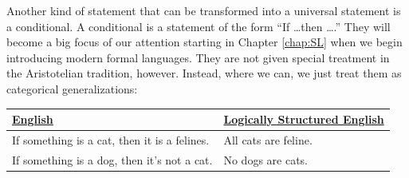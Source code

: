 %
%
%
%
%
%
%

Another kind of statement that can be transformed into a universal statement is a conditional. A conditional is a statement of the form ``If \ldots then \ldots.'' They will become a big focus of our attention starting in Chapter \ref{chap:SL} when we begin introducing modern formal languages. They are not given special treatment in the Aristotelian tradition, however. Instead, where we can, we just treat them as categorical generalizations:

\begin{longtabu}{p{.5\linewidth}p{.5\linewidth}}
\underline{English} &
\underline{Logically Structured English} \\
\endhead
If something is a cat, then it is a felines. &
All cats are feline.\\

If something is a dog, then it's not a cat. &
No dogs are cats. \\
\end{longtabu}

